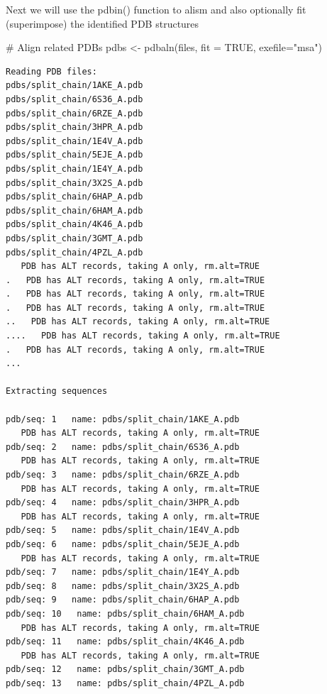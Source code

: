 \documentclass[
  letterpaper,
  DIV=11,
  numbers=noendperiod]{scrartcl}
\newenvironment{Shaded}{\begin{snugshade}}{\end{snugshade}}
\newcommand{\AttributeTok}[1]{\textcolor[rgb]{0.40,0.45,0.13}{#1}}
\newcommand{\CommentTok}[1]{\textcolor[rgb]{0.37,0.37,0.37}{#1}}
\newcommand{\ConstantTok}[1]{\textcolor[rgb]{0.56,0.35,0.01}{#1}}
\newcommand{\FunctionTok}[1]{\textcolor[rgb]{0.28,0.35,0.67}{#1}}
\newcommand{\NormalTok}[1]{\textcolor[rgb]{0.00,0.23,0.31}{#1}}
\newcommand{\OtherTok}[1]{\textcolor[rgb]{0.00,0.23,0.31}{#1}}
\newcommand{\StringTok}[1]{\textcolor[rgb]{0.13,0.47,0.30}{#1}}
\begin{document}
Next we will use the pdbin() function to alism and also optionally fit
(superimpose) the identified PDB structures

\begin{Shaded}
\begin{Highlighting}[]
\CommentTok{\# Align related PDBs}
\NormalTok{pdbs }\OtherTok{\textless{}{-}} \FunctionTok{pdbaln}\NormalTok{(files, }\AttributeTok{fit =} \ConstantTok{TRUE}\NormalTok{, }\AttributeTok{exefile=}\StringTok{"msa"}\NormalTok{)}
\end{Highlighting}
\end{Shaded}

\begin{verbatim}
Reading PDB files:
pdbs/split_chain/1AKE_A.pdb
pdbs/split_chain/6S36_A.pdb
pdbs/split_chain/6RZE_A.pdb
pdbs/split_chain/3HPR_A.pdb
pdbs/split_chain/1E4V_A.pdb
pdbs/split_chain/5EJE_A.pdb
pdbs/split_chain/1E4Y_A.pdb
pdbs/split_chain/3X2S_A.pdb
pdbs/split_chain/6HAP_A.pdb
pdbs/split_chain/6HAM_A.pdb
pdbs/split_chain/4K46_A.pdb
pdbs/split_chain/3GMT_A.pdb
pdbs/split_chain/4PZL_A.pdb
   PDB has ALT records, taking A only, rm.alt=TRUE
.   PDB has ALT records, taking A only, rm.alt=TRUE
.   PDB has ALT records, taking A only, rm.alt=TRUE
.   PDB has ALT records, taking A only, rm.alt=TRUE
..   PDB has ALT records, taking A only, rm.alt=TRUE
....   PDB has ALT records, taking A only, rm.alt=TRUE
.   PDB has ALT records, taking A only, rm.alt=TRUE
...

Extracting sequences

pdb/seq: 1   name: pdbs/split_chain/1AKE_A.pdb 
   PDB has ALT records, taking A only, rm.alt=TRUE
pdb/seq: 2   name: pdbs/split_chain/6S36_A.pdb 
   PDB has ALT records, taking A only, rm.alt=TRUE
pdb/seq: 3   name: pdbs/split_chain/6RZE_A.pdb 
   PDB has ALT records, taking A only, rm.alt=TRUE
pdb/seq: 4   name: pdbs/split_chain/3HPR_A.pdb 
   PDB has ALT records, taking A only, rm.alt=TRUE
pdb/seq: 5   name: pdbs/split_chain/1E4V_A.pdb 
pdb/seq: 6   name: pdbs/split_chain/5EJE_A.pdb 
   PDB has ALT records, taking A only, rm.alt=TRUE
pdb/seq: 7   name: pdbs/split_chain/1E4Y_A.pdb 
pdb/seq: 8   name: pdbs/split_chain/3X2S_A.pdb 
pdb/seq: 9   name: pdbs/split_chain/6HAP_A.pdb 
pdb/seq: 10   name: pdbs/split_chain/6HAM_A.pdb 
   PDB has ALT records, taking A only, rm.alt=TRUE
pdb/seq: 11   name: pdbs/split_chain/4K46_A.pdb 
   PDB has ALT records, taking A only, rm.alt=TRUE
pdb/seq: 12   name: pdbs/split_chain/3GMT_A.pdb 
pdb/seq: 13   name: pdbs/split_chain/4PZL_A.pdb 
\end{verbatim}
\end{document}
